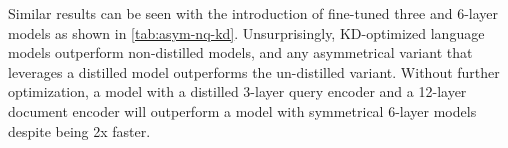 Similar results can be seen with the introduction of fine-tuned three and 6-layer models as shown in \ref{tab:asym-nq-kd}. Unsurprisingly, KD-optimized language models outperform non-distilled models, and any asymmetrical variant that leverages a distilled model outperforms the un-distilled variant. Without further optimization, a model with a distilled 3-layer query encoder and a 12-layer document encoder will outperform a model with symmetrical 6-layer models despite being 2x faster. \\
\begin{table}[!htb]
    \centering
    \caption{Impact of Structural pruning before fine-tuning on Retrieval Accuracy on NQ passage retrieval dataset}
\end{table}
